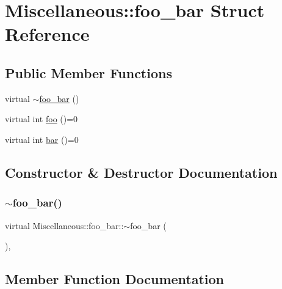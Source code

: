 \hypertarget{structMiscellaneous_1_1foo__bar}{}\section{Miscellaneous\+::foo\+\_\+bar Struct Reference}
\label{structMiscellaneous_1_1foo__bar}
\subsection*{Public Member Functions}
\begin{DoxyCompactItemize}
\item 
virtual \mbox{\hyperlink{structMiscellaneous_1_1foo__bar_a03a529c90562ce2872750d053ad4b53d}{$\sim$foo\+\_\+bar}} ()
\item 
virtual int \mbox{\hyperlink{structMiscellaneous_1_1foo__bar_a6a6286d52f0e74ce2b90a72c34a5a5dd}{foo}} ()=0
\item 
virtual int \mbox{\hyperlink{structMiscellaneous_1_1foo__bar_a8820fa1b96e313ecf54559e0154c5c4b}{bar}} ()=0
\end{DoxyCompactItemize}


\subsection{Constructor \& Destructor Documentation}
\mbox{\label{structMiscellaneous_1_1foo__bar_a03a529c90562ce2872750d053ad4b53d}} 
\subsubsection{\texorpdfstring{$\sim$foo\_bar()}{~foo\_bar()}}
{\footnotesize\ttfamily virtual Miscellaneous\+::foo\+\_\+bar\+::$\sim$foo\+\_\+bar (\begin{DoxyParamCaption}{ }\end{DoxyParamCaption})\hspace{0.3cm}{\ttfamily [inline]}, {\ttfamily [virtual]}}



\subsection{Member Function Documentation}
\mbox{\label{structMiscellaneous_1_1foo__bar_a8820fa1b96e313ecf54559e0154c5c4b}} 
